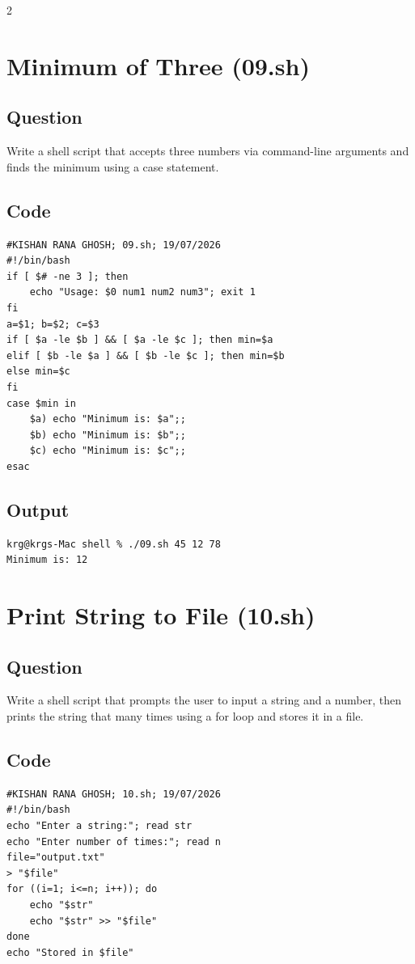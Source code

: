 \documentclass[a4paper,12pt]{article}
\begin{document}
\begin{multicols}{2}

\section{Minimum of Three (09.sh)}
\subsection*{Question}
Write a shell script that accepts three numbers via command-line arguments and finds the minimum using a case statement.

\subsection*{Code}
\begin{lstlisting}[style=bashstyle]
#KISHAN RANA GHOSH; 09.sh; 19/07/2026
#!/bin/bash
if [ $# -ne 3 ]; then
    echo "Usage: $0 num1 num2 num3"; exit 1
fi
a=$1; b=$2; c=$3
if [ $a -le $b ] && [ $a -le $c ]; then min=$a
elif [ $b -le $a ] && [ $b -le $c ]; then min=$b
else min=$c
fi
case $min in
    $a) echo "Minimum is: $a";;
    $b) echo "Minimum is: $b";;
    $c) echo "Minimum is: $c";;
esac
\end{lstlisting}

\subsection*{Output}
\begin{lstlisting}[style=outputstyle]
krg@krgs-Mac shell % ./09.sh 45 12 78
Minimum is: 12
\end{lstlisting}

\columnbreak

\section{Print String to File (10.sh)}
\subsection*{Question}
Write a shell script that prompts the user to input a string and a number, then prints the string that many times using a for loop and stores it in a file.

\subsection*{Code}
\begin{lstlisting}[style=bashstyle]
#KISHAN RANA GHOSH; 10.sh; 19/07/2026
#!/bin/bash
echo "Enter a string:"; read str
echo "Enter number of times:"; read n
file="output.txt"
> "$file"
for ((i=1; i<=n; i++)); do
    echo "$str"
    echo "$str" >> "$file"
done
echo "Stored in $file"
\end{lstlisting}


\end{multicols}
\end{document}
